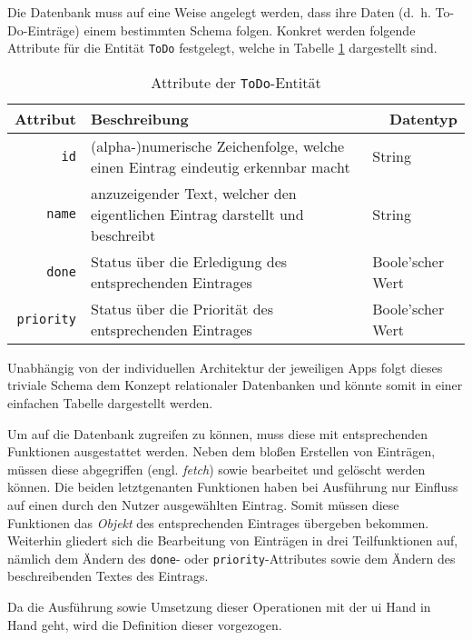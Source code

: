 Die Datenbank muss auf eine Weise angelegt werden, dass ihre Daten (d.\ h. To-Do-Einträge) einem bestimmten Schema folgen. Konkret werden folgende Attribute für die Entität \texttt{ToDo} festgelegt, welche in Tabelle \ref{tab:entity} dargestellt sind.

\begin{table}[h!]
	\centering
	\begin{tabular}{r|p{9cm}|l}
		\textbf{Attribut} & \multicolumn{1}{l|}{\textbf{Beschreibung}} & \multicolumn{1}{r}{\textbf{Datentyp}} \\ \hline
		\texttt{id}          & (alpha-)numerische Zeichenfolge, welche einen Eintrag eindeutig erkennbar macht                    & String                                \\
		\texttt{name}            & anzuzeigender Text, welcher den eigentlichen Eintrag darstellt und beschreibt                   & String                              \\
		\texttt{done}   & Status über die Erledigung des entsprechenden Eintrages                    & Boole'scher Wert \\
		\texttt{priority}   & Status über die Priorität des entsprechenden Eintrages                    & Boole'scher Wert \\                                  
	\end{tabular}
	\caption{Attribute der \texttt{ToDo}-Entität} \label{tab:entity}
\end{table}


Unabhängig von der individuellen Architektur der jeweiligen Apps folgt dieses triviale Schema dem Konzept relationaler Datenbanken und könnte somit in einer einfachen Tabelle dargestellt werden.

Um auf die Datenbank zugreifen zu können, muss diese mit entsprechenden Funktionen ausgestattet werden. Neben dem bloßen Erstellen von Einträgen, müssen diese abgegriffen (engl. \textit{fetch}) sowie bearbeitet und gelöscht werden können. Die beiden letztgenanten Funktionen haben bei Ausführung nur Einfluss auf einen durch den Nutzer ausgewählten Eintrag. Somit müssen diese Funktionen das \textit{Objekt} des entsprechenden Eintrages übergeben bekommen. Weiterhin gliedert sich die Bearbeitung von Einträgen in drei Teilfunktionen auf, nämlich dem Ändern des \texttt{done}- oder \texttt{priority}-Attributes sowie dem Ändern des beschreibenden Textes des Eintrags.

Da die Ausführung sowie Umsetzung dieser Operationen mit der \ac{ui} Hand in Hand geht, wird die Definition dieser vorgezogen.
